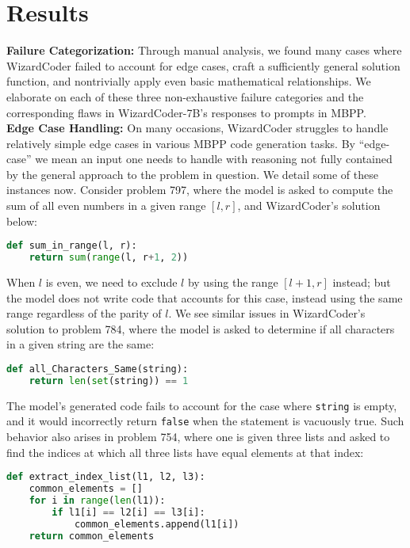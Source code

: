 \documentclass[10pt]{article}
\newcommand{\code}[1]{\texttt{#1}}
\theoremstyle{definition}
\begin{document}
\section{Results}
\noindent\textbf{Failure Categorization:} Through manual analysis, we found many cases where WizardCoder failed to account for edge cases, craft a sufficiently general solution function, and nontrivially apply even basic mathematical relationships. We elaborate on each of these three non-exhaustive failure categories and the corresponding flaws in WizardCoder-7B's responses to prompts in MBPP.\\

\noindent\textbf{Edge Case Handling:} On many occasions, WizardCoder struggles to handle relatively simple edge cases in various MBPP code generation tasks. By ``edge-case'' we mean an input one needs to handle with reasoning not fully contained by the general approach to the problem in question. We detail some of these instances now. Consider problem 797, where the model is asked to compute the sum of all even numbers in a given range $[l, r]$, and WizardCoder's solution below:
\begin{lstlisting}[language=Python]
def sum_in_range(l, r):
    return sum(range(l, r+1, 2))
\end{lstlisting}
\noindent When $l$ is even, we need to exclude $l$ by using the range $[l+1, r]$ instead; but the model does not write code that accounts for this case, instead using the same range regardless of the parity of $l$. We see similar issues in WizardCoder's solution to problem 784, where the model is asked to determine if all characters in a given string are the same:
\begin{lstlisting}[language=Python]
def all_Characters_Same(string):
    return len(set(string)) == 1
\end{lstlisting}
\noindent The model's generated code fails to account for the case where \code{string} is empty, and it would incorrectly return \code{false} when the statement is vacuously true. Such behavior also arises in problem 754, where one is given three lists and asked to find the indices at which all three lists have equal elements at that index:
\begin{lstlisting}[language=Python]
def extract_index_list(l1, l2, l3):
    common_elements = []
    for i in range(len(l1)):
        if l1[i] == l2[i] == l3[i]:
            common_elements.append(l1[i])
    return common_elements
\end{lstlisting}
\end{document}
